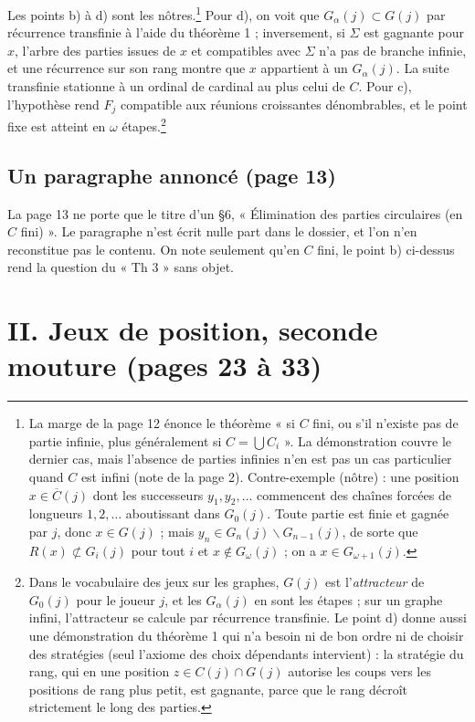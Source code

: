 \documentclass[11pt,a4paper]{article}
\begin{document}
Les points b) à d) sont les nôtres.\footnote{La marge de la page 12 énonce le
théorème « si $C$ fini, ou s'il n'existe pas de partie infinie, plus
généralement si $C = \bigcup C_i$ ». La démonstration couvre le dernier cas,
mais l'absence de parties infinies n'en est pas un cas particulier quand $C$
est infini (note de la page 2). Contre-exemple (nôtre) : une position
$x \in \overline{C}(j)$ dont les successeurs $y_1, y_2, \ldots$ commencent des
chaînes forcées de longueurs $1, 2, \ldots$ aboutissant dans $G_0(j)$. Toute
partie est finie et gagnée par $j$, donc $x \in G(j)$ ; mais
$y_n \in G_n(j) \smallsetminus G_{n-1}(j)$, de sorte que
$R(x) \not\subset G_i(j)$ pour tout $i$ et $x \notin G_\omega(j)$ ; on a
$x \in G_{\omega + 1}(j)$.} Pour d), on voit que $G_\alpha(j) \subset G(j)$
par récurrence transfinie à l'aide du théorème 1 ; inversement, si $\Sigma$
est gagnante pour $x$, l'arbre des parties issues de $x$ et compatibles avec
$\Sigma$ n'a pas de branche infinie, et une récurrence sur son rang montre
que $x$ appartient à un $G_\alpha(j)$. La suite transfinie stationne à un
ordinal de cardinal au plus celui de $C$. Pour c), l'hypothèse rend $F_j$
compatible aux réunions croissantes dénombrables, et le point fixe est atteint
en $\omega$ étapes.\footnote{Dans le vocabulaire des jeux sur les graphes,
$G(j)$ est l'\emph{attracteur} de $G_0(j)$ pour le joueur $j$, et les
$G_\alpha(j)$ en sont les étapes ; sur un graphe infini, l'attracteur se
calcule par récurrence transfinie. Le point d) donne aussi une démonstration
du théorème 1 qui n'a besoin ni de bon ordre ni de choisir des stratégies
(seul l'axiome des choix dépendants intervient) : la stratégie du rang, qui en une position
$z \in C(j) \cap G(j)$ autorise les coups vers les positions de rang plus
petit, est gagnante, parce que le rang décroît strictement le long des
parties.}

\subsection*{Un paragraphe annoncé (page 13)}

La page 13 ne porte que le titre d'un §6, « Élimination des parties
circulaires (en $C$ fini) ». Le paragraphe n'est écrit nulle part dans le
dossier, et l'on n'en reconstitue pas le contenu. On note seulement qu'en $C$
fini, le point b) ci-dessus rend la question du « Th 3 » sans objet.

\section*{II. Jeux de position, seconde mouture (pages 23 à 33)}
\end{document}
